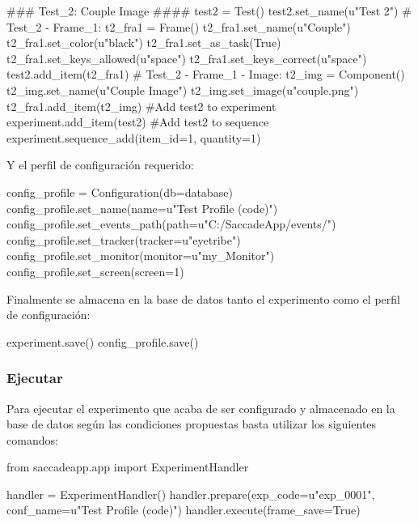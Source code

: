 \documentclass[\main/Main.tex]{subfiles}
\begin{document}
\begin{singlespace}\begin{python}
### Test_2: Couple Image ####
test2 = Test()
test2.set_name(u"Test 2")
# Test_2 - Frame_1: 
t2_fra1 = Frame()
t2_fra1.set_name(u"Couple")
t2_fra1.set_color(u"black")
t2_fra1.set_as_task(True)
t2_fra1.set_keys_allowed(u"space")
t2_fra1.set_keys_correct(u"space")
test2.add_item(t2_fra1)
# Test_2 - Frame_1 - Image:
t2_img = Component()
t2_img.set_name(u"Couple Image")
t2_img.set_image(u"couple.png")
t2_fra1.add_item(t2_img)
#Add test2 to experiment
experiment.add_item(test2)
#Add test2 to sequence
experiment.sequence_add(item_id=1, quantity=1)
\end{python}\end{singlespace}

                Y el perfil de configuración requerido:
\begin{singlespace}\begin{python}
config_profile = Configuration(db=database)
config_profile.set_name(name=u"Test Profile (code)")
config_profile.set_events_path(path=u"C:/SaccadeApp/events/")
config_profile.set_tracker(tracker=u"eyetribe")
config_profile.set_monitor(monitor=u"my_Monitor")
config_profile.set_screen(screen=1)
\end{python}\end{singlespace}
    
                Finalmente se almacena en la base de datos tanto el experimento como el perfil de configuración:
\begin{singlespace}\begin{python}
experiment.save()
config_profile.save()
\end{python}\end{singlespace}

            \subsubsection{Ejecutar}
                Para ejecutar el experimento que acaba de ser configurado y almacenado en la base de datos según las condiciones propuestas basta utilizar los siguientes comandos:
\begin{singlespace}\begin{python}
from saccadeapp.app import ExperimentHandler

handler = ExperimentHandler()
handler.prepare(exp_code=u"exp_0001", conf_name=u"Test Profile (code)")
handler.execute(frame_save=True)
\end{python}\end{singlespace}
\end{document}
